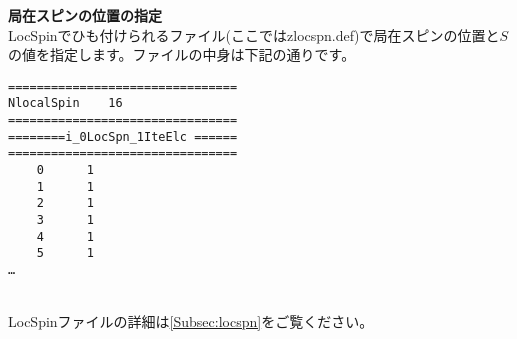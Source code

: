 \begin{description}
\item {\bf 局在スピンの位置の指定}\\
LocSpinでひも付けられるファイル(ここではzlocspn.def)で局在スピンの位置と$S$の値を指定します。ファイルの中身は下記の通りです。\\
\begin{minipage}{15cm}
\begin{screen}
\begin{verbatim}
================================ 
NlocalSpin    16  
================================ 
========i_0LocSpn_1IteElc ====== 
================================ 
    0      1
    1      1
    2      1
    3      1
    4      1
    5      1
…
\end{verbatim}
\end{screen}
\end{minipage}
~\\
LocSpinファイルの詳細は\ref{Subsec:locspn}をご覧ください。
\end{description}

